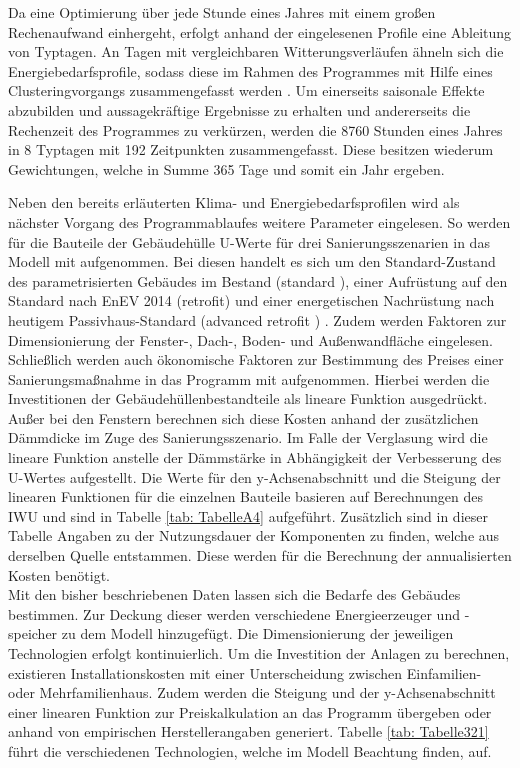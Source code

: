 Da eine Optimierung über jede Stunde eines Jahres mit einem großen Rechenaufwand einhergeht, erfolgt anhand der eingelesenen Profile eine Ableitung von Typtagen.
An Tagen mit vergleichbaren Witterungsverläufen ähneln sich die Energiebedarfsprofile, sodass diese im Rahmen des Programmes mit Hilfe eines Clusteringvorgangs zusammengefasst werden \cite{Dubielzig.2007}.
Um einerseits saisonale Effekte abzubilden und aussagekräftige Ergebnisse zu erhalten und andererseits die Rechenzeit des Programmes zu verkürzen, werden die 8760 Stunden eines Jahres in 8 Typtagen mit 192 Zeitpunkten zusammengefasst.
Diese besitzen wiederum Gewichtungen, welche in Summe 365 Tage und somit ein Jahr ergeben.

Neben den bereits erläuterten Klima- und Energiebedarfsprofilen wird als nächster Vorgang des Programmablaufes weitere Parameter eingelesen.
So werden für die Bauteile der Gebäudehülle U-Werte für drei Sanierungsszenarien in das Modell mit aufgenommen.
Bei diesen handelt es sich um den Standard-Zustand des parametrisierten Gebäudes im Bestand (\glqq standard \grqq), einer Aufrüstung auf den Standard nach EnEV 2014 (\glqq retrofit\grqq) und einer energetischen Nachrüstung nach heutigem Passivhaus-Standard (\glqq advanced retrofit \grqq) \cite{.2015}.
Zudem werden Faktoren zur Dimensionierung der Fenster-, Dach-, Boden- und Außenwandfläche eingelesen.\\
Schließlich werden auch ökonomische Faktoren zur Bestimmung des Preises einer Sanierungsmaßnahme in das Programm mit aufgenommen. 
Hierbei werden die Investitionen der Gebäudehüllenbestandteile als lineare Funktion ausgedrückt.
Außer bei den Fenstern berechnen sich diese Kosten anhand der zusätzlichen Dämmdicke im Zuge des Sanierungsszenario.
Im Falle der Verglasung wird die lineare Funktion anstelle der Dämmstärke in Abhängigkeit der Verbesserung des U-Wertes aufgestellt.
Die Werte für den y-Achsenabschnitt und die Steigung der linearen Funktionen für die einzelnen Bauteile basieren auf Berechnungen des IWU \cite{Hinz.10.08.2015} und sind in Tabelle \ref{tab: TabelleA4} aufgeführt.
Zusätzlich sind in dieser Tabelle Angaben zu der Nutzungsdauer der Komponenten zu finden, welche aus derselben Quelle entstammen.
Diese werden für die Berechnung der annualisierten Kosten benötigt.\\
Mit den bisher beschriebenen Daten lassen sich die Bedarfe des Gebäudes bestimmen.
Zur Deckung dieser werden verschiedene Energieerzeuger und -speicher zu dem Modell hinzugefügt.
Die Dimensionierung der jeweiligen Technologien erfolgt kontinuierlich.
Um die Investition der Anlagen zu berechnen, existieren Installationskosten mit einer Unterscheidung zwischen Einfamilien- oder Mehrfamilienhaus.
Zudem werden die Steigung und der y-Achsenabschnitt einer linearen Funktion zur Preiskalkulation an das Programm übergeben oder anhand von empirischen Herstellerangaben generiert.
Tabelle \ref{tab: Tabelle321} führt die verschiedenen Technologien, welche im Modell Beachtung finden, auf.

